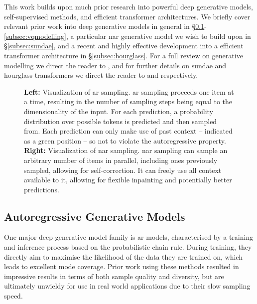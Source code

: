 This work builds upon much prior research into powerful deep generative
models, self-supervised methods, and efficient
transformer architectures. We briefly cover relevant prior work into deep
generative models in general in \S\ref{subsec:agm}-\ref{subsec:vqmodelling}, a
particular \acrshort{nar} generative model we wish to build upon in
\S\ref{subsec:sundae}, and a recent and highly effective development into a
efficient transformer architecture in \S\ref{subsec:hourglass}. For a full
review on generative modelling we direct the reader to
\citet{bondtaylor2021review}, and for further details on \gls{sundae} and
hourglass transformers we direct the reader to \citet{savinov2022stepunrolled}
and \citet{nawrot2021hierarchical} respectively.

\begin{figure}
    \centering
    
    \caption{
        \textbf{Left:} Visualization of \acrfull{ar} sampling. \gls{ar} sampling
        proceeds one item at a time, resulting in the number of sampling steps
        being equal to the dimensionality of the input. For each prediction, a
        probability distribution over possible tokens is predicted and then
        sampled from. Each prediction can only make use of past context --
        indicated as a green position -- so not to violate the autoregressive
        property.
        \textbf{Right:} Visualization of \acrfull{nar} sampling. \gls{nar}
        sampling can sample an arbitrary number of items in parallel, including
        ones previously sampled, allowing for self-correction. It can freely use
        all context available to it, allowing for flexible inpainting and
        potentially better predictions.
    }
\end{figure}

\subsection{Autoregressive Generative Models}
\label{subsec:agm}
One major deep generative model family is \acrfull{ar} models, characterised by
a training and inference process based on the probabilistic chain rule. During
training, they directly aim to maximise the likelihood of the data they are
trained on, which leads to excellent mode coverage. Prior work using these
methods resulted in impressive results in terms of both sample quality and
diversity, but are ultimately unwieldy for use in real world applications due to
their slow sampling speed.

